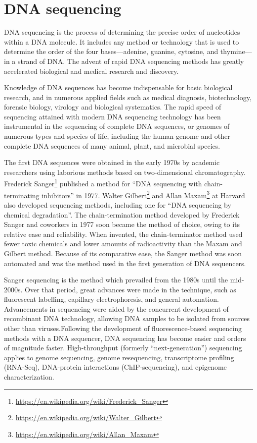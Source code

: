 \documentclass[]{book}
\let\rmarkdownfootnote\footnote%
\def\footnote{\protect\rmarkdownfootnote}
\renewcommand{\href}[2]{#2\footnote{\url{#1}}}
\theoremstyle{definition}
\theoremstyle{definition}
\theoremstyle{definition}
\theoremstyle{remark}
\begin{document}
\chapter{DNA sequencing}\label{dna-sequencing}

DNA sequencing is the process of determining the precise order of
nucleotides within a DNA molecule. It includes any method or technology
that is used to determine the order of the four bases---adenine,
guanine, cytosine, and thymine---in a strand of DNA. The advent of rapid
DNA sequencing methods has greatly accelerated biological and medical
research and discovery.

Knowledge of DNA sequences has become indispensable for basic biological
research, and in numerous applied fields such as medical diagnosis,
biotechnology, forensic biology, virology and biological systematics.
The rapid speed of sequencing attained with modern DNA sequencing
technology has been instrumental in the sequencing of complete DNA
sequences, or genomes of numerous types and species of life, including
the human genome and other complete DNA sequences of many animal, plant,
and microbial species.

The first DNA sequences were obtained in the early 1970s by academic
researchers using laborious methods based on two-dimensional
chromatography.
\href{https://en.wikipedia.org/wiki/Frederick_Sanger}{Frederick Sanger}
published a method for ``DNA sequencing with chain-terminating
inhibitors'' in 1977.
\href{https://en.wikipedia.org/wiki/Walter_Gilbert}{Walter Gilbert} and
\href{https://en.wikipedia.org/wiki/Allan_Maxam}{Allan Maxam} at Harvard
also developed sequencing methods, including one for ``DNA sequencing by
chemical degradation''. The chain-termination method developed by
Frederick Sanger and coworkers in 1977 soon became the method of choice,
owing to its relative ease and reliability. When invented, the
chain-terminator method used fewer toxic chemicals and lower amounts of
radioactivity than the Maxam and Gilbert method. Because of its
comparative ease, the Sanger method was soon automated and was the
method used in the first generation of DNA sequencers.

Sanger sequencing is the method which prevailed from the 1980s until the
mid-2000s. Over that period, great advances were made in the technique,
such as fluorescent labelling, capillary electrophoresis, and general
automation. Advancements in sequencing were aided by the concurrent
development of recombinant DNA technology, allowing DNA samples to be
isolated from sources other than viruses.Following the development of
fluorescence-based sequencing methods with a DNA sequencer, DNA
sequencing has become easier and orders of magnitude faster.
High-throughput (formerly ``next-generation'') sequencing applies to
genome sequencing, genome resequencing, transcriptome profiling
(RNA-Seq), DNA-protein interactions (ChIP-sequencing), and epigenome
characterization.
\end{document}
